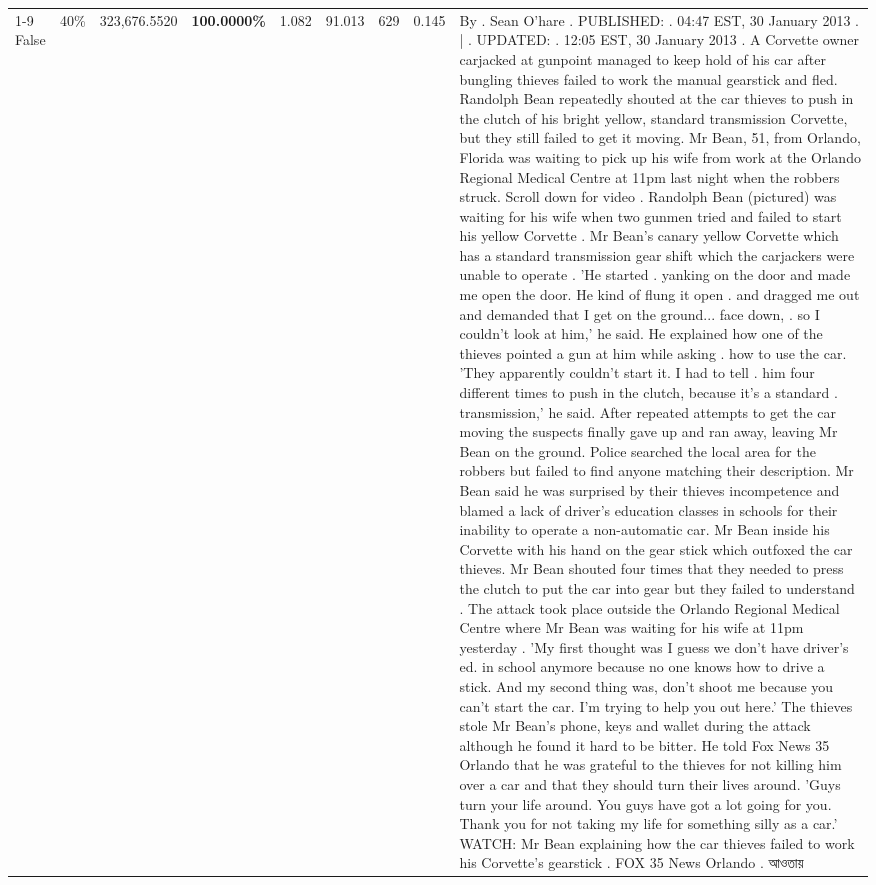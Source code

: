 \begin{table}[H]
\begin{tabular}{lllrlllll}
\cline{1-9} \cline{2-9}
False & 40\% & 323,676.5520 & \bfseries \color{red} 100.0000\% & 1.082 & 91.013 & 629 & 0.145 & By . Sean O'hare . PUBLISHED: . 04:47 EST, 30 January 2013 . | . UPDATED: . 12:05 EST, 30 January 2013 . A Corvette owner carjacked at gunpoint managed to keep hold of his car after bungling thieves failed to work the manual gearstick and fled. Randolph Bean repeatedly shouted at the car thieves to push in the clutch of his bright yellow, standard transmission Corvette, but they still failed to get it moving. Mr Bean, 51, from Orlando, Florida was waiting to pick up his wife from work at the Orlando Regional Medical Centre at 11pm last night when the robbers struck. Scroll down for video . Randolph Bean (pictured) was waiting for his wife when two gunmen tried and failed to start his yellow Corvette . Mr Bean's canary yellow Corvette which has a standard transmission gear shift which the carjackers were unable to operate . 'He started . yanking on the door and made me open the door. He kind of flung it open . and dragged me out and demanded that I get on the ground... face down, . so I couldn't look at him,' he said. He explained how one of the thieves pointed a gun at him while asking . how to use the car. 'They apparently couldn't start it. I had to tell . him four different times to push in the clutch, because it's a standard . transmission,' he said. After repeated attempts to get the car moving the suspects finally gave up and ran away, leaving Mr Bean on the ground. Police searched the local area for the robbers but failed to find anyone matching their description. Mr Bean said he was surprised by their thieves incompetence and blamed a lack of driver's education classes in schools for their inability to operate a non-automatic car. Mr Bean inside his Corvette with his hand on the gear stick which outfoxed the car thieves. Mr Bean shouted four times that they needed to press the clutch to put the car into gear but they failed to understand . The attack took place outside the Orlando Regional Medical Centre where Mr Bean was waiting for his wife at 11pm yesterday . 'My first thought was I guess we don't have driver's ed. in school anymore because no one knows how to drive a stick. And my second thing was, don't shoot me because you can't start the car. I'm trying to help you out here.' The thieves stole Mr Bean's phone, keys and wallet during the attack although he found it hard to be bitter. He told Fox News 35 Orlando that he was grateful to the thieves for not killing him over a car and that they should turn their lives around. 'Guys turn your life around. You guys have got a lot going for you. Thank you for not taking my life for something silly as a car.' WATCH: Mr Bean explaining how the car thieves failed to work his Corvette's gearstick . FOX 35 News Orlando . আওতায় \\

\end{tabular}
\end{table}
